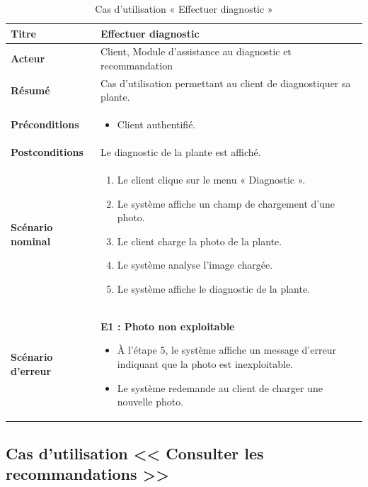 \begin{table}[H]
\centering
\renewcommand{\arraystretch}{1.4}
\begin{tabular}{|p{4cm}|p{10cm}|}
\hline
\textbf{Titre} & Effectuer diagnostic \\
\hline
\textbf{Acteur} & Client, Module d'assistance au diagnostic et recommandation \\
\hline
\textbf{Résumé} & Cas d'utilisation permettant au client de diagnostiquer sa plante. \\
\hline
\textbf{Préconditions} &
\vspace{-12pt}
\begin{itemize}
    \item Client authentifié.
\end{itemize} \\
\hline
\textbf{Postconditions} & Le diagnostic de la plante est affiché. \\
\hline
\textbf{Scénario nominal} &
\vspace{-12pt}
\begin{enumerate}
    \item Le client clique sur le menu « Diagnostic ».
    \item Le système affiche un champ de chargement d'une photo.
    \item Le client charge la photo de la plante.
    \item Le système analyse l'image chargée.
    \item Le système affiche le diagnostic de la plante.
\end{enumerate} \\
\hline
\textbf{Scénario d'erreur} &
\vspace{-12pt}
\textbf{E1 : Photo non exploitable}
\begin{itemize}
    \item À l'étape 5, le système affiche un message d'erreur indiquant que la photo est inexploitable.
    \item Le système redemande au client de charger une nouvelle photo.
\end{itemize} \\
\hline
\end{tabular}
\caption{Cas d'utilisation « Effectuer diagnostic »}
\label{tableau 16}
\end{table}

\subsection{Cas d'utilisation << Consulter les recommandations >>}

